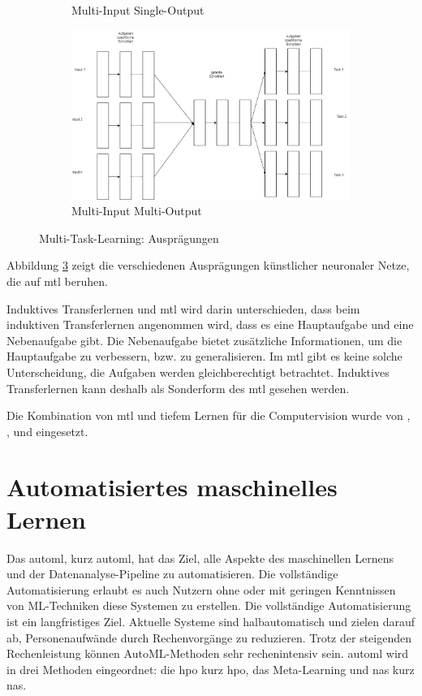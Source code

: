 \begin{figure}[h]
\begin{subfigure}[c]{0.49\textwidth}
				\caption[MTL-MISO]{Multi-Input Single-Output}
				\label{img:MTL_MISO}	
			\end{subfigure}
			\begin{subfigure}[c]{0.49\textwidth}			
				\includegraphics[width=1\textwidth, center]{bilder/Grundlagen/MTL/MTL_MIMO.png}
				\caption[MTL-MIMO]{Multi-Input Multi-Output}
				\label{img:MTL-MIMO}	
			\end{subfigure}
			\caption{Multi-Task-Learning: Ausprägungen}
			\label{img:MultiTaskLernen}
		\end{figure}
		Abbildung \ref{img:MultiTaskLernen} zeigt die verschiedenen Ausprägungen künstlicher neuronaler Netze, die auf \ac{mtl} beruhen.
		
		Induktives Transferlernen und \acl{mtl} wird darin unterschieden, dass beim induktiven Transferlernen angenommen wird, dass es eine Hauptaufgabe und eine Nebenaufgabe gibt. Die Nebenaufgabe bietet zusätzliche Informationen, um die Hauptaufgabe zu verbessern, bzw. zu generalisieren. Im \ac{mtl} gibt es keine solche Unterscheidung, die Aufgaben werden gleichberechtigt betrachtet. Induktives Transferlernen kann deshalb als Sonderform des \acl{mtl} gesehen werden. 
		
		Die Kombination von \acl{mtl} und tiefem Lernen für die Computervision wurde von \cite{YuchunFang.2017}, \cite{Li.2016}, \cite{RajeevRanjan.2016} und \cite{Zhao.2019} eingesetzt.

	\section{Automatisiertes maschinelles Lernen}
	\label{sec:AutoML}
	Das \acl{automl}, kurz \ac{automl}, hat das Ziel, alle Aspekte des maschinellen Lernens und der Datenanalyse-Pipeline zu automatisieren. Die vollständige Automatisierung erlaubt es auch Nutzern ohne oder mit geringen Kenntnissen von ML-Techniken diese Systemen zu erstellen. Die vollständige Automatisierung ist ein langfristiges Ziel. Aktuelle Systeme sind halbautomatisch und zielen darauf ab, Personenaufwände durch Rechenvorgänge zu reduzieren. Trotz der steigenden Rechenleistung können AutoML-Methoden sehr rechenintensiv sein. \ac{automl} wird in drei Methoden eingeordnet: die \acl{hpo} kurz \ac{hpo}, das  Meta-Learning und \acl{nas} kurz \ac{nas}. 
	\cite{Hutter.2019} 
	
